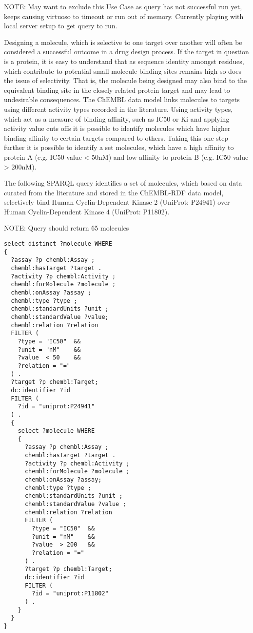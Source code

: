 \documentclass[sw]{iosart2c}
\begin{document}
NOTE: May want to exclude this Use Case as query has not successful run yet, keeps causing virtuoso 
to timeout or run out of memory. Currently playing with local server setup to get query to run.

Designing a molecule, which is selective to one target over another will often be considered a 
successful outcome in a drug design process. If the target in question is a protein, it is easy
to understand that as sequence identity amongst residues, which contribute to potential small 
molecule binding sites remains high so does the issue of selectivity. That is, the molecule being 
designed may also bind to the equivalent binding site in the  closely related protein 
target and may lead to undesirable consequences. The ChEMBL data model links molecules to 
targets using different activity types recorded in the literature. Using activity types, 
which act as a measure of binding affinity, such as IC50 or Ki and applying activity value cuts
offs it is possible to identify molecules which have higher binding affinity to certain targets 
compared to others. Taking this one step further it is possible to identify a set molecules, 
which have a high affinity to protein A (e.g. IC50 value < 50nM) and low affinity to protein 
B (e.g. IC50 value > 200nM). 

The following SPARQL query identifies a set of molecules, which based on data curated from the 
literature and stored in the ChEMBL-RDF data model, selectively bind Human Cyclin-Dependent Kinase 2 
(UniProt: P24941) over Human Cyclin-Dependent Kinase 4 (UniProt: P11802). 

NOTE: Query should return 65 molecules

\begin{tiny}
\begin{verbatim}
select distinct ?molecule WHERE 
{ 
  ?assay ?p chembl:Assay ;
  chembl:hasTarget ?target .
  ?activity ?p chembl:Activity ;
  chembl:forMolecule ?molecule ;
  chembl:onAssay ?assay ;
  chembl:type ?type ;
  chembl:standardUnits ?unit ;
  chembl:standardValue ?value;
  chembl:relation ?relation
  FILTER (
    ?type = "IC50"  &&
    ?unit = "nM"    &&
    ?value  < 50    &&
    ?relation = "="
  ) .
  ?target ?p chembl:Target;
  dc:identifier ?id
  FILTER (
    ?id = "uniprot:P24941"
  ) .
  { 
    select ?molecule WHERE 
    {
      ?assay ?p chembl:Assay ;
      chembl:hasTarget ?target .
      ?activity ?p chembl:Activity ;
      chembl:forMolecule ?molecule ;
      chembl:onAssay ?assay;
      chembl:type ?type ;
      chembl:standardUnits ?unit ;
      chembl:standardValue ?value ;
      chembl:relation ?relation
      FILTER (
        ?type = "IC50"  &&
        ?unit = "nM"    &&
        ?value  > 200   &&
        ?relation = "="
      ) .
      ?target ?p chembl:Target;
      dc:identifier ?id
      FILTER (
        ?id = "uniprot:P11802"
      ) .
    }
  }
}
\end{verbatim}
\end{tiny}
\end{document}
